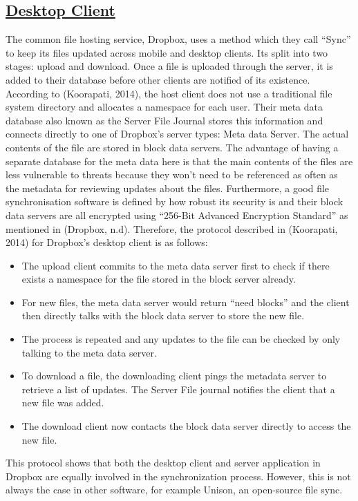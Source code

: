 \documentclass{article}
\begin{document}
\subsection{\underline{Desktop Client}}
The common file hosting service, Dropbox, uses a method which they call “Sync” to keep its files updated across mobile and desktop clients. Its split into two stages: upload and download.
Once a file is uploaded through the server, it is added to their database before other clients are notified of its existence. According to (Koorapati, 2014), the host client does not use a traditional file system directory and allocates a namespace for each user. Their meta data database also known as the Server File Journal stores this information and connects directly to one of Dropbox’s server types: Meta data Server. The actual contents of the file are stored in block data servers. The advantage of having a separate database for the meta data here is that the main contents of the files are less vulnerable to threats because they won't need to be referenced as often as the metadata for reviewing updates about the files. Furthermore, a good file synchronisation software is defined by how robust its security is and their block data servers are all encrypted using “256-Bit Advanced Encryption Standard” as mentioned in (Dropbox, n.d).
Therefore, the protocol described in (Koorapati, 2014) for Dropbox’s desktop client is as follows:
\begin{itemize}
\item The upload client commits to the meta data server first to check if there exists a namespace for the file stored in the block server already.
\item For new files, the meta data server would return “need blocks” and the client then directly talks with the block data server to store the new file.
\item The process is repeated and any updates to the file can be checked by only talking to the meta data server.
\item To download a file, the downloading client pings the metadata server to retrieve a list of updates. The Server File journal notifies the client that a new file was added.
\item The download client now contacts the block data server directly to access the new file.
\end{itemize}
This protocol shows that both the desktop client and server application in Dropbox are equally involved in the synchronization process. However, this is not always the case in other software, for example Unison, an open-source file sync.
\end{document}
